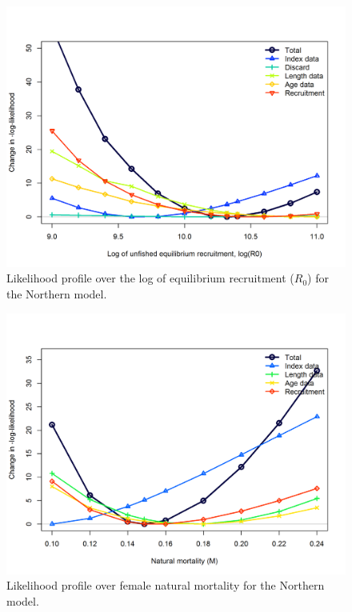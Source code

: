 \documentclass[12pt,]{article}
\begin{document}
\begin{figure}[htbp]
\centering
\includegraphics{Figures/profiles/profile_logR0.N.png}
\caption{Likelihood profile over the log of equilibrium recruitment
(\(R_0\)) for the Northern model. \label{fig:profile_logR0.N}}
\end{figure}

\FloatBarrier

\begin{figure}[htbp]
\centering
\includegraphics{Figures/profiles/profile_M.N.png}
\caption{Likelihood profile over female natural mortality for the
Northern model. \label{fig:profile_M.N}}
\end{figure}
\end{document}
